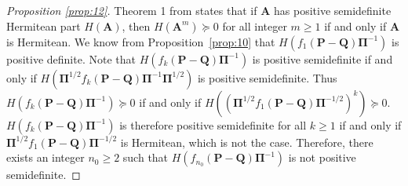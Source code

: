 \documentclass[10pt,twocolumn]{article}
\numberwithin{equation}{section}
\begin{document}
\begin{proof}[Proposition \ref{prop:12}]
  Theorem 1 from \cite{johnson75:_power_matric_posit_defin_real_part}
  states that if $\mathbf{A}$ has positive semidefinite Hermitean part
  $H(\mathbf{A})$, then $H(\mathbf{A}^{m}) \succeq 0$ for all integer
  $m \geq 1$ if and only if $\mathbf{A}$ is Hermitean. We know from
  Proposition~\ref{prop:10} that $H(f_1(\mathbf{P} -
  \mathbf{Q})\bm{\Pi}^{-1})$ is positive definite. Note that
  $H(f_{k}(\mathbf{P} - \mathbf{Q})\bm{\Pi}^{-1})$ is positive
  semidefinite if and only if $H(\bm{\Pi}^{1/2}f_{k}(\mathbf{P} -
  \mathbf{Q}) \bm{\Pi}^{-1} \bm{\Pi}^{1/2})$ is positive
  semidefinite. Thus $H(f_{k}(\mathbf{P} - \mathbf{Q})\bm{\Pi}^{-1})
  \succeq 0$ if and only if $H((\bm{\Pi}^{1/2}f_{1}(\mathbf{P} -
  \mathbf{Q})\bm{\Pi}^{-1/2})^{k}) \succeq 0$.  $H(f_{k}(\mathbf{P} -
  \mathbf{Q})\bm{\Pi}^{-1})$ is therefore positive semidefinite for
  all $k \geq 1$ if and only if $\bm{\Pi}^{1/2}f_{1}(\mathbf{P} -
  \mathbf{Q})\bm{\Pi}^{-1/2}$ is Hermitean, which is not the
  case. Therefore, there exists an integer $n_0 \geq 2$ such that
  $H(f_{n_0}(\mathbf{P} - \mathbf{Q})\bm{\Pi}^{-1})$ is not positive
  semidefinite.
\end{proof}
\end{document}
